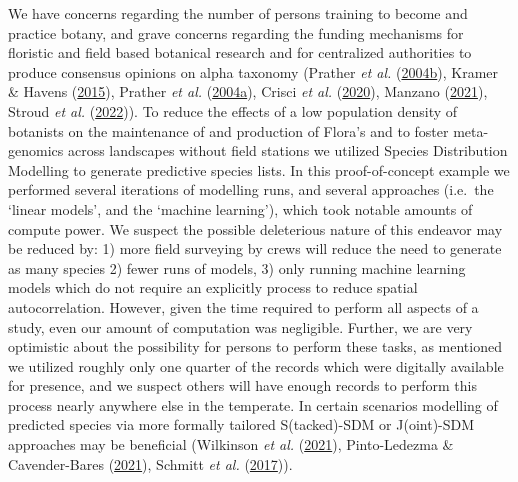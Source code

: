 \documentclass[
]{article}
\begin{document}
We have concerns regarding the number of persons training to become and
practice botany, and grave concerns regarding the funding mechanisms for
floristic and field based botanical research and for centralized
authorities to produce consensus opinions on alpha taxonomy (Prather
\emph{et al.} (\protect\hyperlink{ref-prather2004decline}{2004b}),
Kramer \& Havens (\protect\hyperlink{ref-kramer2015report}{2015}),
Prather \emph{et al.}
(\protect\hyperlink{ref-prather2004implications}{2004a}), Crisci
\emph{et al.} (\protect\hyperlink{ref-crisci2020end}{2020}), Manzano
(\protect\hyperlink{ref-manzano2021flippant}{2021}), Stroud \emph{et
al.} (\protect\hyperlink{ref-stroud2022botanical}{2022})). To reduce the
effects of a low population density of botanists on the maintenance of
and production of Flora's and to foster meta-genomics across landscapes
without field stations we utilized Species Distribution Modelling to
generate predictive species lists. In this proof-of-concept example we
performed several iterations of modelling runs, and several approaches
(i.e.~the `linear models', and the `machine learning'), which took
notable amounts of compute power. We suspect the possible deleterious
nature of this endeavor may be reduced by: 1) more field surveying by
crews will reduce the need to generate as many species 2) fewer runs of
models, 3) only running machine learning models which do not require an
explicitly process to reduce spatial autocorrelation. However, given the
time required to perform all aspects of a study, even our amount of
computation was negligible. Further, we are very optimistic about the
possibility for persons to perform these tasks, as mentioned we utilized
roughly only one quarter of the records which were digitally available
for presence, and we suspect others will have enough records to perform
this process nearly anywhere else in the temperate. In certain scenarios
modelling of predicted species via more formally tailored S(tacked)-SDM
or J(oint)-SDM approaches may be beneficial (Wilkinson \emph{et al.}
(\protect\hyperlink{ref-wilkinson2021defining}{2021}), Pinto-Ledezma \&
Cavender-Bares (\protect\hyperlink{ref-pinto2021predicting}{2021}),
Schmitt \emph{et al.} (\protect\hyperlink{ref-schmitt2017ssdm}{2017})).
\end{document}
